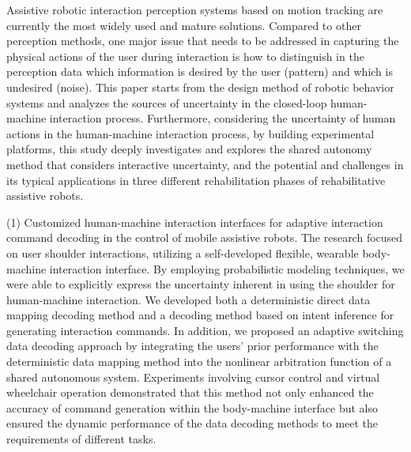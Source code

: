 \begin{abstract*}
Assistive robotic interaction perception systems based on motion tracking are currently the most widely used and mature solutions. Compared to other perception methods, one major issue that needs to be addressed in capturing the physical actions of the user during interaction is how to distinguish in the perception data which information is desired by the user (pattern) and which is undesired (noise). This paper starts from the design method of robotic behavior systems and analyzes the sources of uncertainty in the closed-loop human-machine interaction process. Furthermore, considering the uncertainty of human actions in the human-machine interaction process, by building experimental platforms, this study deeply investigates and explores the shared autonomy method that considers interactive uncertainty, and the potential and challenges in its typical applications in three different rehabilitation phases of rehabilitative assistive robots.

(1) Customized human-machine interaction interfaces for adaptive interaction command decoding in the control of mobile assistive robots. The research focused on user shoulder interactions, utilizing a self-developed flexible, wearable body-machine interaction interface. By employing probabilistic modeling techniques, we were able to explicitly express the uncertainty inherent in using the shoulder for human-machine interaction. We developed both a deterministic direct data mapping decoding method and a decoding method based on intent inference for generating interaction commands. In addition, we proposed an adaptive switching data decoding approach by integrating the users’ prior performance with the deterministic data mapping method into the nonlinear arbitration function of a shared autonomous system. Experiments involving cursor control and virtual wheelchair operation demonstrated that this method not only enhanced the accuracy of command generation within the body-machine interface but also ensured the dynamic performance of the data decoding methods to meet the requirements of different tasks.


\end{abstract*}
